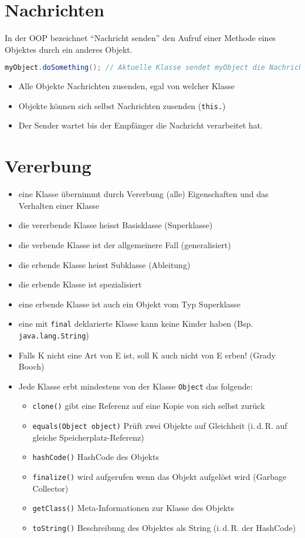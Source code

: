 \section{Nachrichten}
In der OOP bezeichnet \enquote{Nachricht senden} den Aufruf einer Methode eines Objektes durch ein anderes Objekt.

\begin{lstlisting}[language=Java]
myObject.doSomething(); // Aktuelle Klasse sendet myObject die Nachricht doSomething
\end{lstlisting}

\begin{itemize}\itemsep0em
	\item Alle Objekte Nachrichten zusenden, egal von welcher Klasse
	\item Objekte können sich selbst Nachrichten zusenden (\texttt{this.})
	\item Der Sender wartet bis der Empfänger die Nachricht verarbeitet hat.
\end{itemize}

\section{Vererbung}
\begin{itemize}\itemsep0em
	\item eine Klasse übernimmt durch Vererbung (alle) Eigenschaften und das Verhalten einer Klasse
	\item die vererbende Klasse heisst Basisklasse (Superklasse)
	\item die verbende Klasse ist der allgemeinere Fall (generalisiert)
	\item die erbende Klasse heisst Subklasse (Ableitung)
	\item die erbende Klasse ist spezialisiert
	\item eine erbende Klasse ist auch ein Objekt vom Typ Superklasse
	\item eine mit \texttt{final} deklarierte Klasse kann keine Kinder haben (Bsp. \texttt{java.lang.String})
	\item Falls K nicht eine Art von E ist, soll K auch nicht von E erben! (Grady Booch)
	\item Jede Klasse erbt mindestens von der Klasse \texttt{Object} das folgende:
	\begin{itemize}
		\item \texttt{clone()} gibt eine Referenz auf eine Kopie von sich selbst zurück
		\item \texttt{equals(Object object)} Prüft zwei Objekte auf Gleichheit (i.\,d.\,R. auf gleiche Speicherplatz-Referenz)
		\item \texttt{hashCode()} HashCode des Objekts
		\item \texttt{finalize()} wird aufgerufen wenn das Objekt aufgelöst wird (Garbage Collector)
		\item \texttt{getClass()} Meta-Informationen zur Klasse des Objekts
		\item \texttt{toString()} Beschreibung des Objektes als String (i.\,d.\,R. der HashCode)
	\end{itemize}
\end{itemize}

